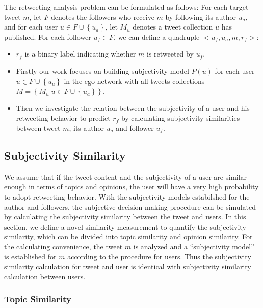 \documentclass[letterpaper]{article}
\begin{document}
The retweeting analysis problem can be formulated as follows:
For each target tweet $ m $, let $ F $ denotes the followers who receive $ m $ by following its author $ u_{a} $, and for each user $ u \in F \cup \left\lbrace u_{a} \right\rbrace  $, let $ M_{u} $ denotes a tweet collection $ u $ has published. 
For each follower $ u_{f} \in F $, we can define a quadruple $ <u_{f}, u_{a}, m, r_{f}>  $: 
\begin{itemize}
\item $ r_{f} $ is a binary label indicating whether $ m $ is retweeted by $ u_{f} $.
\item Firstly our work focuses on building subjectivity model $ P\left( u \right)  $ for each user $ u \in F \cup \left\lbrace u_{a} \right\rbrace $ in the ego network with all tweets collections $ M=\left\lbrace M_{u} | u \in F \cup \left\lbrace u_{a} \right\rbrace  \right\rbrace  $.
\item Then we investigate the relation between the subjectivity of a user and his retweeting behavior to predict $ r_{f} $ by calculating subjectivity similarities between tweet $ m $, its author $ u_{a} $ and follower $ u_{f} $. 
\end{itemize}

\subsection{Subjectivity Similarity}
\label{similarity}

We assume that if the tweet content and the subjectivity of a user are similar enough in terms of topics and opinions, the user will have a very high probability to adopt retweeting behavior. 
With the subjectivity models estabilshed for the author and followers, the subjective decision-making procedure can be simulated by calculating the subjectivity similarity between the tweet and users. 
In this section, we define a novel similarity measurement to quantify the subjectivity similarity, which can be divided into topic similarity and opinion similarity. 
For the calculating convenience, the tweet $ m $ is analyzed and a ``subjectivity model'' is established for  $ m $ according to the procedure for users. 
Thus the subjectivity similarity calculation for tweet and user is identical with subjectivity similarity calculation between users.
 
\subsubsection{Topic Similarity}
\label{topsim}
\end{document}
